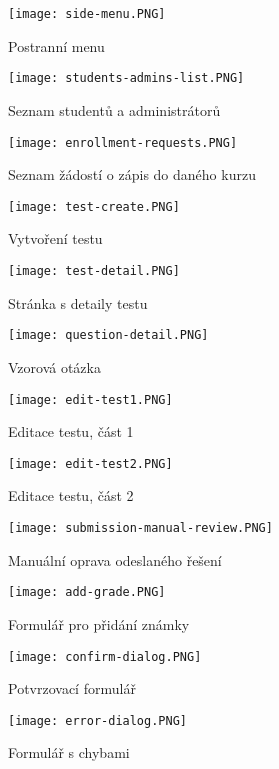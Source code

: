 \begin{figure}
	\centering
	\texttt{[image: side-menu.PNG]}
	\caption{Postranní menu}
	\label{fig:side-menu}
\end{figure}

\begin{figure}
	\centering
	\texttt{[image: students-admins-list.PNG]}
	\caption{Seznam studentů a administrátorů}
	\label{fig:students-admins-list}
\end{figure}

\begin{figure}
	\centering
	\texttt{[image: enrollment-requests.PNG]}
	\caption{Seznam žádostí o zápis do daného kurzu}
	\label{fig:enrollment-requests}
\end{figure}

\begin{figure}
	\centering
	\texttt{[image: test-create.PNG]}
	\caption{Vytvoření testu}
	\label{fig:test-create}
\end{figure}

\begin{figure}
	\centering
	\texttt{[image: test-detail.PNG]}
	\caption{Stránka s detaily testu}
	\label{fig:test-detail}
\end{figure}

\begin{figure}
	\centering
	\texttt{[image: question-detail.PNG]}
	\caption{Vzorová otázka}
	\label{fig:question-detail}
\end{figure}

\begin{figure}
	\centering
	\texttt{[image: edit-test1.PNG]}
	\caption{Editace testu, část 1}
	\label{fig:test-edit1}
\end{figure}

\begin{figure}
	\centering
	\texttt{[image: edit-test2.PNG]}
	\caption{Editace testu, část 2}
	\label{fig:test-edit2}
\end{figure}

\begin{figure}
	\centering
	\texttt{[image: submission-manual-review.PNG]}
	\caption{Manuální oprava odeslaného řešení}
	\label{fig:submission-manual-review}
\end{figure}

\begin{figure}
	\centering
	\texttt{[image: add-grade.PNG]}
	\caption{Formulář pro přidání známky}
	\label{fig:grade-add}
\end{figure}

\begin{figure}
	\centering
	\texttt{[image: confirm-dialog.PNG]}
	\caption{Potvrzovací formulář}
	\label{fig:confirm-dialog}
\end{figure}

\begin{figure}
	\centering
	\texttt{[image: error-dialog.PNG]}
	\caption{Formulář s chybami}
	\label{fig:error-dialog}
\end{figure}
